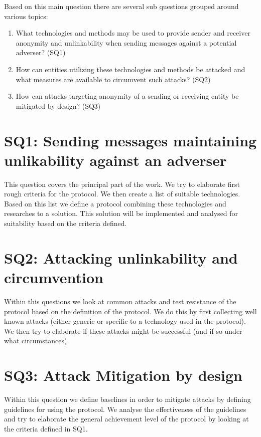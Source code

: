 Based on this main question there are several sub questions grouped around various topics:

\begin{enumerate}
	\item What technologies and methods may be used to provide sender and receiver anonymity and unlinkability when sending messages against a potential adverser? (SQ1)
	\item How can entities utilizing these technologies and methods be attacked and what measures are  available to circumvent such attacks? (SQ2)
	\item How can attacks targeting anonymity of a sending or receiving entity be mitigated by design? (SQ3)
\end{enumerate}

\section{SQ1: Sending messages maintaining unlikability against an adverser}
This question covers the principal part of the work. We try to elaborate first rough criteria for the protocol. We then create a list of suitable technologies. Based on this list we define a protocol combining these technologies and researches to a solution. This solution will be implemented and analysed for suitability based on the criteria defined.

\section{SQ2: Attacking unlinkability and circumvention}
Within this questions we look at common attacks and test resistance of the protocol based on the definition of the protocol. We do this by first collecting well known attacks (either generic or specific to a technology used in the protocol). We then try to elaborate if these attacks might be successful (and if so under what circumstances).

\section{SQ3: Attack Mitigation by design}
Within this question we define baselines in order to mitigate attacks by defining guidelines for using the protocol. We analyse the effectiveness of the guidelines and try to elaborate the general achievement level of the protocol by looking at the criteria defined in SQ1.

